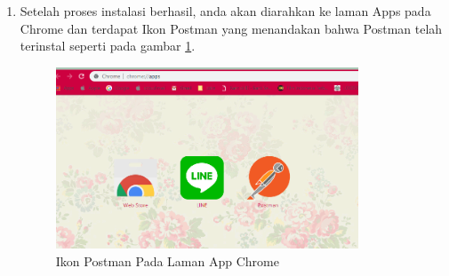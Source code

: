 \begin{enumerate}
\item Setelah proses instalasi berhasil, anda akan diarahkan ke laman Apps pada Chrome dan terdapat Ikon Postman yang menandakan bahwa Postman telah terinstal seperti pada gambar \ref{fig:ipc}.
\begin{figure}[!htbp]
	\centerline{\includegraphics[width=0.85\textwidth]{figures/11/ipc.PNG}}
	\caption{Ikon Postman Pada Laman App Chrome}
	\label{fig:ipc}
\end{figure}
\end{enumerate}

